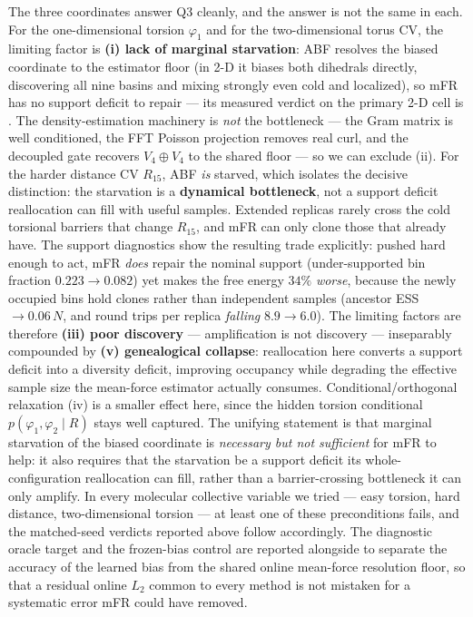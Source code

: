 

The three coordinates answer Q3 cleanly, and the answer is not the same in each. For the
one-dimensional torsion $\varphi_1$ and for the two-dimensional torus CV, the limiting factor
is \textbf{(i) lack of marginal starvation}: ABF resolves the biased coordinate to the
estimator floor (in 2-D it biases both dihedrals directly, discovering all nine basins and
mixing strongly even cold and localized), so mFR has no support deficit to repair --- its
measured verdict on the primary 2-D cell is \CvTwoDmFRVerdict. The density-estimation machinery is \emph{not} the bottleneck --- the Gram matrix is
well conditioned, the FFT Poisson projection removes real curl, and the decoupled gate
recovers $V_4\!\oplus V_4$ to the shared floor --- so we can exclude (ii). For the harder
distance CV $R_{15}$, ABF \emph{is} starved, which isolates the decisive distinction: the
starvation is a \textbf{dynamical bottleneck}, not a support deficit reallocation can fill
with useful samples. Extended replicas rarely cross the cold torsional barriers that change
$R_{15}$, and mFR can only clone those that already have. The support diagnostics show the
resulting trade explicitly: pushed hard enough to act, mFR \emph{does} repair the nominal
support (under-supported bin fraction $0.223\to0.082$) yet makes the free energy $34\%$
\emph{worse}, because the newly occupied bins hold clones rather than independent samples
(ancestor ESS $\to0.06\,N$, and round trips per replica \emph{falling} $8.9\to6.0$). The
limiting factors are therefore \textbf{(iii) poor discovery} --- amplification is not
discovery --- inseparably compounded by \textbf{(v) genealogical collapse}: reallocation here
converts a support deficit into a diversity deficit, improving occupancy while degrading the
effective sample size the mean-force estimator actually consumes. Conditional/orthogonal relaxation (iv) is a smaller effect here, since the
hidden torsion conditional $p(\varphi_1,\varphi_2\mid R)$ stays well captured. The unifying
statement is that marginal starvation of the biased coordinate is \emph{necessary but not
sufficient} for mFR to help: it also requires that the starvation be a support deficit its
whole-configuration reallocation can fill, rather than a barrier-crossing bottleneck it can
only amplify. In every molecular collective variable we tried --- easy torsion, hard distance,
two-dimensional torsion --- at least one of these preconditions fails, and the matched-seed
verdicts reported above follow accordingly. The diagnostic oracle target and the frozen-bias
control are reported alongside to separate the accuracy of the learned bias from the shared
online mean-force resolution floor, so that a residual online $L_2$ common to every method is
not mistaken for a systematic error mFR could have removed.
